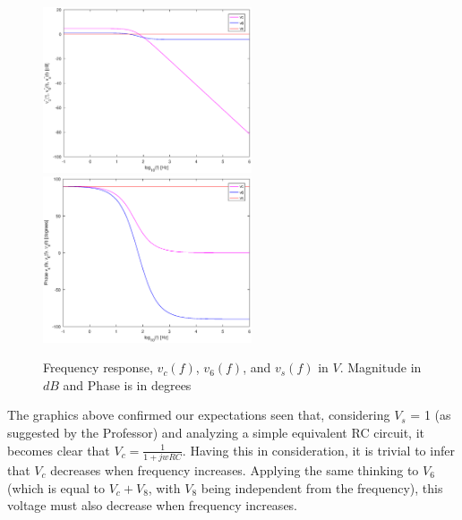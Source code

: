 \begin{figure}[!ht] 
\caption{Frequency response, $v_{c}(f)$, $v_6(f)$, and $v_s(f)$ in $V$. Magnitude in $dB$ and Phase is in degrees}
\includegraphics[width=0.55\textwidth]{theoretical_6_dB.eps}
\hfill\includegraphics[width=0.55\textwidth]{theoretical_6_phase.eps}
\label{fig:theoretical_6}
\end{figure}

The graphics above confirmed our expectations seen that, considering $V_s$ = 1 (as suggested by the Professor) and analyzing a simple equivalent RC circuit, it becomes clear that $V_c = \frac{1}{1 + jwRC}$. Having this in consideration, it is trivial to infer that $V_c$ decreases when frequency increases. Applying the same thinking to $V_6$ (which is equal to $V_c + V_8$, with $V_8$ being independent from the frequency), this voltage must also decrease when frequency increases.
\newpage 

\newpage 





